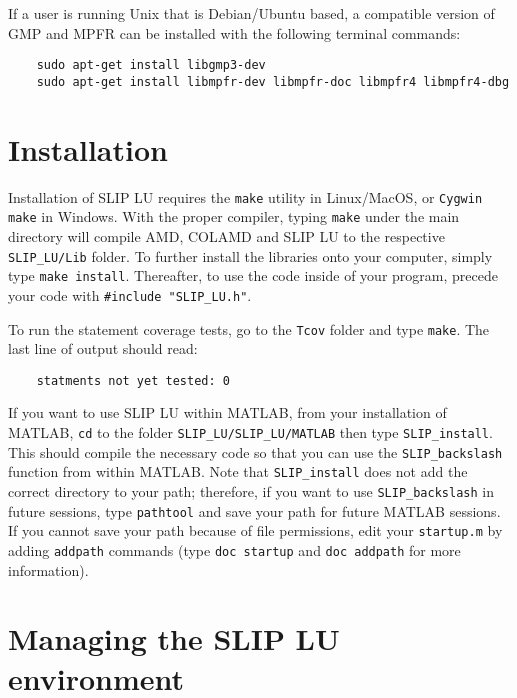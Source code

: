 \documentclass[12pt]{article}
\theoremstyle{definition}
\begin{document}
If a user is running Unix that is Debian/Ubuntu based, a compatible version of
GMP and MPFR can be installed with the following terminal commands:

{\small
\begin{verbatim}
    sudo apt-get install libgmp3-dev
    sudo apt-get install libmpfr-dev libmpfr-doc libmpfr4 libmpfr4-dbg
\end{verbatim} }

\section{Installation} \label{s:install}

Installation of SLIP LU requires the \verb|make| utility in Linux/MacOS, or
\verb|Cygwin make| in Windows. With the proper compiler, typing \verb|make|
under the main directory will compile AMD, COLAMD and SLIP LU to the respective
\verb|SLIP_LU/Lib| folder. To further install the libraries onto your computer,
simply type \verb|make install|.  Thereafter, to use the code inside of your
program, precede your code with \verb|#include "SLIP_LU.h"|.

To run the statement coverage tests, go to the \verb|Tcov| folder and
type \verb|make|.  The last line of output should read:

\begin{verbatim}
    statments not yet tested: 0
\end{verbatim}

If you want to use SLIP LU within MATLAB, from your installation of MATLAB,
\verb|cd| to the folder \verb|SLIP_LU/SLIP_LU/MATLAB| then type
\verb|SLIP_install|. This should compile the necessary code so that you can use
the \verb|SLIP_backslash| function from within MATLAB. Note that
\verb|SLIP_install| does not add the correct directory to your path; therefore,
if you want to use \verb|SLIP_backslash| in future sessions, type
\verb|pathtool| and save your path for future MATLAB sessions. If you cannot
save your path because of file permissions, edit your \verb|startup.m| by
adding \verb|addpath| commands (type \verb|doc startup| and \verb|doc addpath|
for more information).

\section{Managing the SLIP LU environment} \label{s:user:setup}
\end{document}
